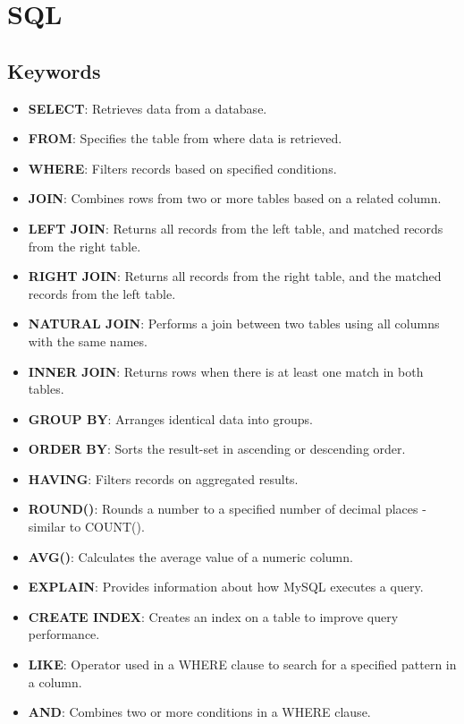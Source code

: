 \section*{SQL}

\subsection*{Keywords}

\begin{itemize}[noitemsep,leftmargin=*]
    \item \textbf{SELECT}: Retrieves data from a database.
    \item \textbf{FROM}: Specifies the table from where data is retrieved.
    \item \textbf{WHERE}: Filters records based on specified conditions.
    \item \textbf{JOIN}: Combines rows from two or more tables based on a related column.
    \item \textbf{LEFT JOIN}: Returns all records from the left table, and matched records from the right table.
    \item \textbf{RIGHT JOIN}: Returns all records from the right table, and the matched records from the left table.
    \item \textbf{NATURAL JOIN}: Performs a join between two tables using all columns with the same names.
    \item \textbf{INNER JOIN}: Returns rows when there is at least one match in both tables.
    \item \textbf{GROUP BY}: Arranges identical data into groups.
    \item \textbf{ORDER BY}: Sorts the result-set in ascending or descending order.
    \item \textbf{HAVING}: Filters records on aggregated results.
    \item \textbf{ROUND()}: Rounds a number to a specified number of decimal places - similar to COUNT().
    \item \textbf{AVG()}: Calculates the average value of a numeric column.
    \item \textbf{EXPLAIN}: Provides information about how MySQL executes a query.
    \item \textbf{CREATE INDEX}: Creates an index on a table to improve query performance.
    \item \textbf{LIKE}: Operator used in a WHERE clause to search for a specified pattern in a column.
    \item \textbf{AND}: Combines two or more conditions in a WHERE clause.

\end{itemize}
